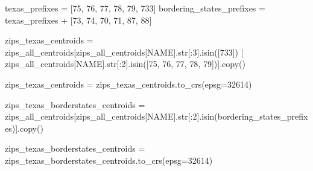 \documentclass[
  letterpaper,
  DIV=11,
  numbers=noendperiod]{scrartcl}
\newenvironment{Shaded}{\begin{snugshade}}{\end{snugshade}}
\newcommand{\BuiltInTok}[1]{\textcolor[rgb]{0.00,0.23,0.31}{#1}}
\newcommand{\DecValTok}[1]{\textcolor[rgb]{0.68,0.00,0.00}{#1}}
\newcommand{\NormalTok}[1]{\textcolor[rgb]{0.00,0.23,0.31}{#1}}
\newcommand{\OperatorTok}[1]{\textcolor[rgb]{0.37,0.37,0.37}{#1}}
\newcommand{\StringTok}[1]{\textcolor[rgb]{0.13,0.47,0.30}{#1}}
\begin{document}
\begin{Shaded}
\begin{Highlighting}[]
\NormalTok{texas\_prefixes }\OperatorTok{=}\NormalTok{ [}\StringTok{\textquotesingle{}75\textquotesingle{}}\NormalTok{, }\StringTok{\textquotesingle{}76\textquotesingle{}}\NormalTok{, }\StringTok{\textquotesingle{}77\textquotesingle{}}\NormalTok{, }\StringTok{\textquotesingle{}78\textquotesingle{}}\NormalTok{, }\StringTok{\textquotesingle{}79\textquotesingle{}}\NormalTok{, }\StringTok{\textquotesingle{}733\textquotesingle{}}\NormalTok{]}
\NormalTok{bordering\_states\_prefixes }\OperatorTok{=}\NormalTok{ texas\_prefixes }\OperatorTok{+}\NormalTok{ [}\StringTok{\textquotesingle{}73\textquotesingle{}}\NormalTok{, }\StringTok{\textquotesingle{}74\textquotesingle{}}\NormalTok{, }\StringTok{\textquotesingle{}70\textquotesingle{}}\NormalTok{, }\StringTok{\textquotesingle{}71\textquotesingle{}}\NormalTok{, }\StringTok{\textquotesingle{}87\textquotesingle{}}\NormalTok{, }\StringTok{\textquotesingle{}88\textquotesingle{}}\NormalTok{]}

\NormalTok{zips\_texas\_centroids }\OperatorTok{=}\NormalTok{ zips\_all\_centroids[zips\_all\_centroids[}\StringTok{\textquotesingle{}NAME\textquotesingle{}}\NormalTok{].}\BuiltInTok{str}\NormalTok{[:}\DecValTok{3}\NormalTok{].isin([}\StringTok{\textquotesingle{}733\textquotesingle{}}\NormalTok{]) }\OperatorTok{|}\NormalTok{ zips\_all\_centroids[}\StringTok{\textquotesingle{}NAME\textquotesingle{}}\NormalTok{].}\BuiltInTok{str}\NormalTok{[:}\DecValTok{2}\NormalTok{].isin([}\StringTok{\textquotesingle{}75\textquotesingle{}}\NormalTok{, }\StringTok{\textquotesingle{}76\textquotesingle{}}\NormalTok{, }\StringTok{\textquotesingle{}77\textquotesingle{}}\NormalTok{, }\StringTok{\textquotesingle{}78\textquotesingle{}}\NormalTok{, }\StringTok{\textquotesingle{}79\textquotesingle{}}\NormalTok{])].copy()}

\NormalTok{zips\_texas\_centroids }\OperatorTok{=}\NormalTok{ zips\_texas\_centroids.to\_crs(epsg}\OperatorTok{=}\DecValTok{32614}\NormalTok{)}

\NormalTok{zips\_texas\_borderstates\_centroids }\OperatorTok{=}\NormalTok{ zips\_all\_centroids[zips\_all\_centroids[}\StringTok{\textquotesingle{}NAME\textquotesingle{}}\NormalTok{].}\BuiltInTok{str}\NormalTok{[:}\DecValTok{2}\NormalTok{].isin(bordering\_states\_prefixes)].copy()}

\NormalTok{zips\_texas\_borderstates\_centroids }\OperatorTok{=}\NormalTok{ zips\_texas\_borderstates\_centroids.to\_crs(epsg}\OperatorTok{=}\DecValTok{32614}\NormalTok{)}


\end{Highlighting}
\end{Shaded}
\end{document}
